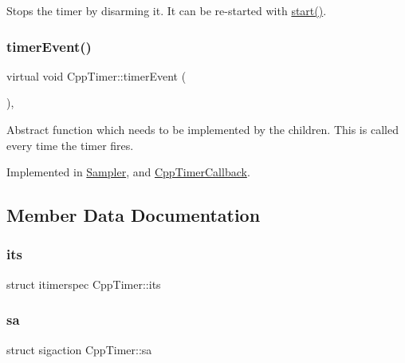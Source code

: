 Stops the timer by disarming it. It can be re-\/started with \hyperlink{classCppTimer_a64989025caa3c030c6c397ca76a2d20b}{start()}. \mbox{\label{classCppTimer_ac2665403595b6aee5f581d0ebfeb886c}} 
\subsubsection{\texorpdfstring{timer\+Event()}{timerEvent()}}
{\footnotesize\ttfamily virtual void Cpp\+Timer\+::timer\+Event (\begin{DoxyParamCaption}{ }\end{DoxyParamCaption})\hspace{0.3cm}{\ttfamily [protected]}, {}}

Abstract function which needs to be implemented by the children. This is called every time the timer fires. 

Implemented in \hyperlink{classSampler_addf333c6e247ee3a1def41260caa902a}{Sampler}, and \hyperlink{classCppTimerCallback_af6b39f5eb8e98bfc1b301ac3f25276e9}{Cpp\+Timer\+Callback}.



\subsection{Member Data Documentation}
\mbox{\label{classCppTimer_a8774fb5ba9af8f276874c1234741f106}} 
\subsubsection{\texorpdfstring{its}{its}}
{\footnotesize\ttfamily struct itimerspec Cpp\+Timer\+::its\hspace{0.3cm}{\ttfamily [private]}}

\mbox{\label{classCppTimer_a692a200df6d2c43b72ff1db76458f09f}} 
\subsubsection{\texorpdfstring{sa}{sa}}
{\footnotesize\ttfamily struct sigaction Cpp\+Timer\+::sa\hspace{0.3cm}{\ttfamily [private]}}

